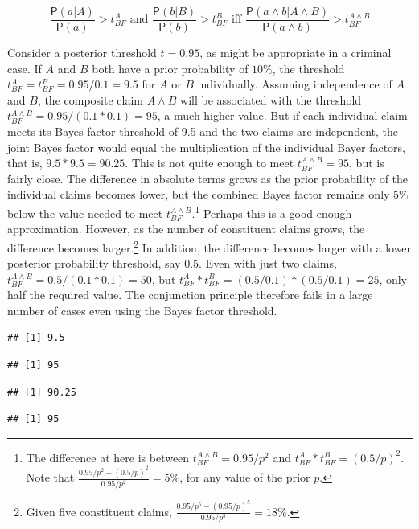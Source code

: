 \documentclass[10pt,dvipsnames,enabledeprecatedfontcommands]{scrartcl}
\newcommand{\et}{\wedge}
\newcommand{\pr}[1]{\mathsf{P}(#1)}
\begin{document}
\[  \text{ $\frac{\pr{a | A }}{\pr{a}}>t^A_{BF}$ and $\frac{\pr{ b | B}}{\pr{b}}>t^B_{BF}$ iff $\frac{\pr{a \et b | A \et B}}{\pr{a \et b}}>t^{A\wedge B}_{BF}$ } \]

\noindent
Consider a posterior threshold \(t=0.95\), as might be appropriate in a
criminal case. If \(A\) and \(B\) both have a prior probability of
\(10\%\), the threshold \(t^A_{BF}=t_{BF}^B=0.95/0.1=9.5\) for \(A\) or
\(B\) individually. Assuming independence of \(A\) and \(B\), the
composite claim \(A \wedge B\) will be associated with the threshold
\(t^{A\wedge B}_{BF}=0.95/(0.1*0.1)=95\), a much higher value. But if
each individual claim meets its Bayes factor threshold of 9.5 and the
two claims are independent, the joint Bayes factor would equal the
multiplication of the individual Bayer factors, that is,
\(9.5*9.5=90.25\). This is not quite enough to meet
\(t^{A\wedge B}_{BF}=95\), but is fairly close. The difference in
absolute terms grows as the prior probability of the individual claims
becomes lower, but the combined Bayes factor remains only \(5\%\) below
the value needed to meet
\(t_{BF}^{A\wedge B}\).\footnote{The difference at here is between $t_{BF}^{A\wedge B}=0.95/p^2$ and $t_{BF}^{A}*t_{BF}^{B}=(0.5/p)^{2}$. Note that $\frac{0.95/p^2 - (0.5/p)^{2}}{0.95/p^2}=5\%$, for any value of the prior $p$.}
Perhaps this is a good enough approximation. However, as the number of
constituent claims grows, the difference becomes
larger.\footnote{Given five constituent claims, $\frac{0.95/p^5 - (0.95/p)^{5}}{0.95/p^5}=18\%$.}
In addition, the difference becomes larger with a lower posterior
probability threshold, say \(0.5\). Even with just two claims,
\(t^{A\wedge B}_{BF}=0.5/(0.1*0.1)=50\), but
\(t^A_{BF}*t_{BF}^B=(0.5/0.1)*(0.5/0.1)=25\), only half the required
value. The conjunction principle therefore fails in a large number of
cases even using the Bayes factor threshold.

\begin{verbatim}
## [1] 9.5
\end{verbatim}

\begin{verbatim}
## [1] 95
\end{verbatim}

\begin{verbatim}
## [1] 90.25
\end{verbatim}

\begin{verbatim}
## [1] 95
\end{verbatim}
\end{document}
